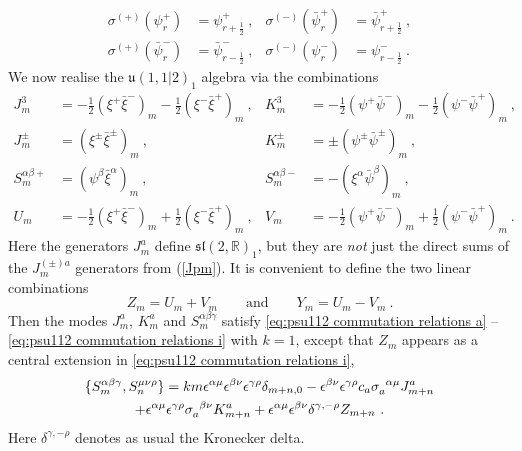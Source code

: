 \documentclass[12pt,a4paper]{article}
\newcommand{\be}{\begin{equation}}
\newcommand{\ee}{\end{equation}}
\begin{document}
\begin{subequations}
\begin{align}
\sigma^{(+)} (\psi^+_r)&=\psi^+_{r+\frac{1}{2}}\ , & \sigma^{(-)} (\bar{\psi}^+_r)&=\bar{\psi}^+_{r+\frac{1}{2}}\ , \label{eq:spectral flow 1f}\\
\sigma^{(+)} (\bar{\psi}^-_r)&=\bar{\psi}^-_{r-\frac{1}{2}}\ , & \sigma^{(-)} (\psi^-_r)&=\psi^-_{r-\frac{1}{2}}\ .\label{eq:spectral flow 2f}
\end{align}
\end{subequations}
We now realise the $\mathfrak{u}(1,1|2)_1$ algebra via the combinations 
\begin{subequations}
\begin{align}
J^3_m&=-\tfrac{1}{2} (\xi^+\bar{\xi}^-)_m-\tfrac{1}{2} (\xi^-\bar{\xi}^+)_m\ , & K^3_m&=-\tfrac{1}{2} (\psi^+\bar{\psi}^-)_m-\tfrac{1}{2} (\psi^-\bar{\psi}^+)_m\ , \\
J^\pm_m&=(\xi^\pm\bar{\xi}^\pm)_m\ , & K^\pm_m&=\pm(\psi^\pm\bar{\psi}^\pm)_m\ , \\
S_m^{\alpha\beta+}&=(\psi^\beta \bar{\xi}^\alpha)_m\ , & S_m^{\alpha\beta-}&=-(\xi^\alpha\bar{\psi}^\beta)_m \ ,  \\
U_m&=-\tfrac{1}{2} (\xi^+\bar{\xi}^-)_m+\tfrac{1}{2} (\xi^-\bar{\xi}^+)_m\ , & V_m&=-\tfrac{1}{2} (\psi^+\bar{\psi}^-)_m+\tfrac{1}{2} (\psi^-\bar{\psi}^+)_m\ .
\end{align}
\end{subequations}
Here the generators $J^a_m$ define $\mathfrak{sl}(2,\mathds{R})_1$, but they are {\it not} just the direct sums of the $J^{(\pm)a}_m$ generators from (\ref{Jpm}). 
It is convenient to define the two linear combinations
\be 
Z_m=U_m+V_m\qquad\text{and}\qquad Y_m=U_m-V_m\ .
\ee
Then the modes $J^a_m$, $K^a_m$ and $S^{\alpha\beta\gamma}_m$ satisfy \eqref{eq:psu112 commutation relations a} -- \eqref{eq:psu112 commutation relations i} with $k=1$, except that $Z_m$ appears as a central extension in \eqref{eq:psu112 commutation relations i},
\begin{multline} 
\{S^{\alpha\beta\gamma}_m,S^{\mu\nu\rho}_n\}=km \epsilon^{\alpha\mu}\epsilon^{\beta\nu}\epsilon^{\gamma\rho}\delta_{m+n,0}-\epsilon^{\beta\nu}\epsilon^{\gamma\rho} c_a\tensor{\sigma}{_a^{\alpha\mu}} J^a_{m+n}\\
+\epsilon^{\alpha\mu}\epsilon^{\gamma\rho} \tensor{\sigma}{_a^{\beta\nu}} K^a_{m+n}+\epsilon^{\alpha\mu}\epsilon^{\beta\nu}\delta^{\gamma,-\rho} Z_{m+n}\ . 
\end{multline}
Here $\delta^{\gamma,-\rho}$ denotes as usual the Kronecker delta.
\end{document}
